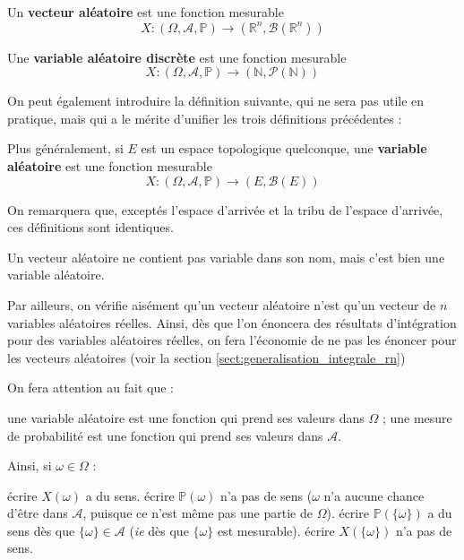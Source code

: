 \documentclass[../integ-proba.tex]{subfiles}
\begin{document}
\begin{defi}
    Un \textbf{vecteur aléatoire} est une fonction mesurable
    $$X:\left(\Omega, \mathcal{A}, \mathbb{P}\right) \longrightarrow \left(\mathbb{R}^n, \mathcal{B}(\mathbb{R}^n)\right)$$
\end{defi}

\begin{defi}
    Une \textbf{variable aléatoire discrète} est une fonction mesurable
    $$X:\left(\Omega, \mathcal{A}, \mathbb{P}\right) \longrightarrow \left(\mathbb{N}, \mathcal{P}(\mathbb{N})\right)$$
\end{defi}

On peut également introduire la définition suivante, qui ne sera pas utile en pratique, mais qui a le mérite d'unifier les trois définitions précédentes :

\begin{defi}
    Plus généralement, si $E$ est un espace topologique quelconque, une \textbf{variable aléatoire} est une fonction mesurable
    $$X:\left(\Omega, \mathcal{A}, \mathbb{P}\right) \longrightarrow \left(E, \mathcal{B}(E)\right)$$
\end{defi}

\begin{rem}
    On remarquera que, exceptés l'espace d'arrivée et la tribu de l'espace d'arrivée, ces définitions sont identiques.
\end{rem}

\begin{rem}
    \label{rem:vect_alea_idem_var}
    Un vecteur aléatoire ne contient pas \og variable \fg dans son nom, mais c'est bien une variable aléatoire.
    
    Par ailleurs, on vérifie aisément qu'un vecteur aléatoire n'est qu'un vecteur de $n$ variables aléatoires réelles.
    Ainsi, dès que l'on énoncera des résultats d'intégration pour des variables aléatoires réelles, on fera l'économie de ne pas les énoncer pour les vecteurs aléatoires (voir la section \ref{sect:generalisation_integrale_rn})
\end{rem}

\begin{rem}
    On fera attention au fait que :
    \begin{itemize}
        \itemb une variable aléatoire est une fonction qui prend ses valeurs dans $\Omega$ ;
        \itemb une mesure de probabilité est une fonction qui prend ses valeurs dans $\mathcal{A}$.
    \end{itemize}
    Ainsi, si $\omega \in \Omega$ :
    \begin{itemize}
        \itemb écrire $X(\omega)$ a du sens.
        \itemb écrire $\mathbb{P}(\omega)$ n'a pas de sens ($\omega$ n'a aucune chance d'être dans $\mathcal{A}$, puisque ce n'est même pas une partie de $\Omega$).
        \itemb écrire $\mathbb{P}(\{\omega\})$ a du sens dès que $\{\omega\}\in \mathcal{A}$ (\textit{ie} dès que $\{\omega\}$ est mesurable).
        \itemb écrire $X(\{\omega\})$ n'a pas de sens.
    \end{itemize}
\end{rem}
\end{document}
